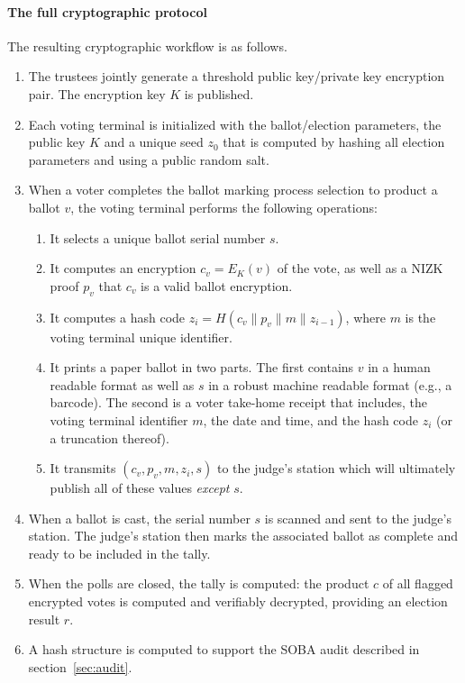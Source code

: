 \paragraph{The full cryptographic protocol}
\label{sec:full-protocol}
The resulting cryptographic workflow is as follows. 
\begin{enumerate}
\item The trustees jointly generate a threshold public key/private key
  encryption pair. The encryption key $K$ is published.
\item Each voting terminal is initialized with the ballot/election
  parameters, the public key $K$ and a unique seed $z_0$ that is
  computed by hashing all election parameters and using a public
  random salt.
\item When a voter completes the ballot marking process selection
  to product a ballot $v$, the voting terminal performs the following operations: 
  \begin{enumerate}
  \item It selects a unique ballot serial number $s$.
  \item It computes an encryption $c_v = E_K(v)$ of the vote, as
    well as a NIZK proof $p_v$ that $c_v$ is a valid ballot encryption.
  \item It computes a hash code $z_i = H(c_v \| p_v \| m \| z_{i-1})$,
    where $m$ is the voting terminal unique identifier.
  \item It prints a paper ballot in two parts. The first contains $v$
    in a human readable format as well as $s$ in a robust machine
    readable format (e.g., a barcode). The second is a voter take-home
    receipt that includes, the voting terminal identifier $m$, the date
    and time, and the hash code $z_i$ (or a truncation thereof).
  \item It transmits $(c_v, p_v, m, z_i, s)$ to
    the judge's station which will ultimately publish all of these values
    {\em except\/} $s$.
  \end{enumerate}
\item When a ballot is cast, the serial number $s$ is scanned and sent
  to the judge's station.  The judge's station then marks the associated ballot
  as complete and ready to be included in the tally.
\item When the polls are closed, the tally is computed: the product
  $c$ of all flagged encrypted votes is computed and verifiably
  decrypted, providing an election result $r$.
\item A hash structure is computed to support the SOBA audit described in
  section~\ref{sec:audit}.
\end{enumerate}


